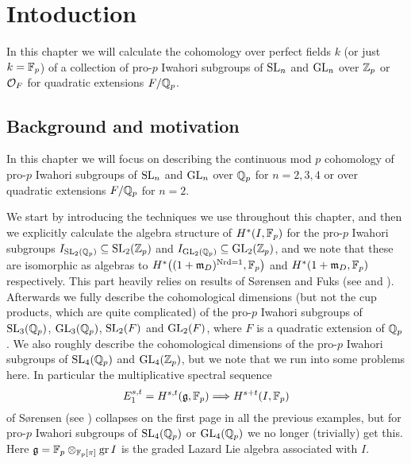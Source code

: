 \section{Intoduction}%
\label{sec:cohiwagps-intro}

In this chapter we will calculate the cohomology over perfect fields $k$ (or just $k = \mathbb{F}_{p}$) of a collection of pro-$p$ Iwahori subgroups of $\operatorname{SL}_{n}$ and $\operatorname{GL}_{n}$ over $\mathbb{Z}_{p}$ or $\mathcal{O}_{F}$ for quadratic extensions $F/\mathbb{Q}_{p}$.

\subsection{Background and motivation}%
\label{subsec:background-iwa}


In this chapter we will focus on describing the continuous mod $p$ cohomology of pro-$p$ Iwahori subgroups of $\operatorname{SL}_{n}$ and $\operatorname{GL}_{n}$ over $\mathbb{Q}_{p}$ for $n=2,3,4$ or over quadratic extensions $F/\mathbb{Q}_{p}$ for $n=2$.

We start by introducing the techniques we use throughout this chapter, and then we explicitly calculate the algebra structure of $H^{*}(I,\mathbb{F}_{p})$ for the pro-$p$ Iwahori subgroups $I_{\operatorname{SL}_{2}(\mathbb{Q}_{p})} \subseteq \operatorname{SL}_{2}(\mathbb{Z}_{p})$ and $I_{\operatorname{GL}_{2}(\mathbb{Q}_{p})} \subseteq \operatorname{GL}_{2}(\mathbb{Z}_{p})$, and we note that these are isomorphic as algebras to $H^{*}\bigl( (1+\mathfrak{m}_{D})^{\operatorname{Nrd} = 1},\mathbb{F}_{p} \bigr)$ and $H^{*}(1+\mathfrak{m}_{D},\mathbb{F}_{p})$ respectively. This part heavily relies on results of Sørensen and Fuks (see \cite{Sor} and \cite{Fuks}). Afterwards we fully describe the cohomological dimensions (but not the cup products, which are quite complicated) of the pro-$p$ Iwahori subgroups of $\operatorname{SL}_{3}(\mathbb{Q}_{p})$, $\operatorname{GL}_{3}(\mathbb{Q}_{p})$, $\operatorname{SL}_{2}(F)$ and $\operatorname{GL}_{2}(F)$, where $F$ is a quadratic extension of $\mathbb{Q}_{p}$. We also roughly describe the cohomological dimensions of the pro-$p$ Iwahori subgroups of $\operatorname{SL}_{4}(\mathbb{Q}_{p})$ and $\operatorname{GL}_{4}(\mathbb{Z}_{p})$, but we note that we run into some problems here. In particular the multiplicative spectral sequence \[ E_{1}^{s,t} = H^{s,t}(\mathfrak{g},\mathbb{F}_{p}) \Longrightarrow H^{s+t}(I,\mathbb{F}_{p}) \] of Sørensen (see \cite{Sor}) collapses on the first page in all the previous examples, but for pro-$p$ Iwahori subgroups of $\operatorname{SL}_{4}(\mathbb{Q}_{p})$ or $\operatorname{GL}_{4}(\mathbb{Q}_{p})$ we no longer (trivially) get this. Here $\mathfrak{g} = \mathbb{F}_{p} \otimes_{\mathbb{F}_{p}[\pi]} \operatorname{gr} I$ is the graded Lazard Lie algebra associated with $I$.

